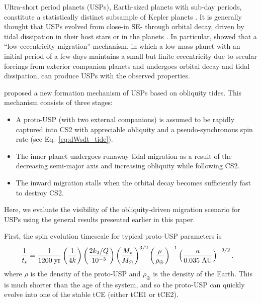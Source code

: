 \documentclass[
        fleqn,
        usenatbib,
        referee
    ]{mnras}
\newcommand*{\p}[1]{\left(#1\right)}
\begin{document}
Ultra-short period planets (USPs), Earth-sized planets with sub-day periods,
constitute a statistically distinct subsample of Kepler planets
\citep[e.g.][]{winn2018kepler}. It is generally thought that USPs evolved from
close-in SE- through orbital decay, driven by tidal dissipation in their host
stars \citep{lee2017magnetospheric} or in the planets \citep{petrovich2019ultra,
pu2019low}. In particular, \citet{pu2019low} showed that a ``low-eccentricity
migration'' mechanism, in which a low-mass planet with an initial period of a
few days maintains a small but finite eccentricity due to secular forcings from
exterior companion planets and undergoes orbital decay and tidal dissipation,
can produce USPs with the observed properties.

\citet{millholland2020formation} proposed a new formation mechanism of USPs
based on obliquity tides. This mechanism consists of three stages:
\begin{itemize}
    \item A proto-USP (with two external companions) is assumed to be rapidly
        captured into CS2 with appreciable obliquity and a pseudo-synchronous
        spin rate (see Eq.~\ref{eq:dWsdt_tide}).

    \item The inner planet undergoes runaway tidal migration as a result of the
        decreasing semi-major axis and increasing obliquity while following CS2.

    \item The inward migration stalls when the orbital decay becomes
        sufficiently fast to destroy CS2.
\end{itemize}

Here, we evaluate the visibility of the obliquity-driven migration scenario for
USPs using the general results presented earlier in this paper.

First, the spin evolution timescale for typical proto-USP parameters is
\begin{align}
    \frac{1}{t_{\rm s}} ={}& \frac{1}{1200\;\mathrm{yr}}
            \p{\frac{1}{4k}}
            \p{\frac{2k_2/Q}{10^{-3}}}
            \p{\frac{M_\star}{M_{\odot}}}^{3/2}
            \p{\frac{\rho}{\rho_{\oplus}}}^{-1}
            \p{\frac{a}{0.035\;\mathrm{AU}}}^{-9/2}.
\end{align}
where $\rho$ is the density of the proto-USP and $\rho_{\oplus}$ is the density
of the Earth. This is much shorter than the age of the system, and so the
proto-USP can quickly evolve into one of the stable tCE (either tCE1 or tCE2).
\end{document}

